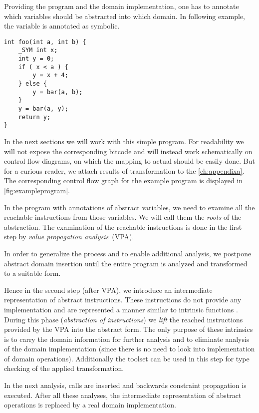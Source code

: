 Providing the program and the domain implementation, one has
to annotate which variables should be abstracted into which domain. In
following example, the variable  is annotated as symbolic.
\begin{verbatim}
int foo(int a, int b) {
    _SYM int x;
    int y = 0;
    if ( x < a ) {
        y = x + 4;
    } else {
        y = bar(a, b);
    }
    y = bar(a, y);
    return y;
}
\end{verbatim}
In the next sections we will work with this simple \Cpp{} program. For
readability we will not expose the corresponding \LLVM bitcode and will instead
work schematically on control flow diagrams, on which the mapping to actual
\LLVM should be easily done. But for a curious reader, we attach results of
\LLVM transformation to the \autoref{ch:appendixa}. The corresponding control
flow graph for the example program is displayed in \autoref{fig:exampleprogram}.

In the program with annotations of abstract variables, we need to examine all the
reachable instructions from those variables. We will call them the
\emph{roots} of the abstraction. The examination of the reachable instructions is
done in the first step by \emph{value propagation analysis}~(VPA).

In order to generalize the process and to enable additional analysis, we
postpone abstract domain insertion until the entire program is analyzed and
transformed to a suitable form.

Hence in the second step (after VPA), we introduce an intermediate representation of
abstract instructions. These instructions do not provide any implementation and
are represented a manner similar to \LLVM intrinsic functions
\cite{LLVM:langref}. During this phase (\emph{abstraction of instructions}) we
\emph{lift} the reached instructions provided by the VPA into the abstract form. The
only purpose of these intrinsics is to carry the domain information for further
analysis and to eliminate analysis of the domain implementation (since there is no need
to look into implementation of domain operations). Additionally the \LLVM
toolset can be used in this step for type checking of the applied transformation.

In the next analysis,  calls are inserted and backwards constraint
propagation is executed. After all these analyses, the intermediate
representation of abstract operations is replaced by a real domain
implementation.

